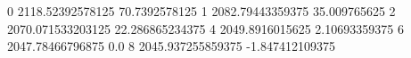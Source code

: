 0 2118.52392578125 70.7392578125
1 2082.79443359375 35.009765625
2 2070.071533203125 22.286865234375
4 2049.8916015625 2.10693359375
6 2047.78466796875 0.0
8 2045.937255859375 -1.847412109375
